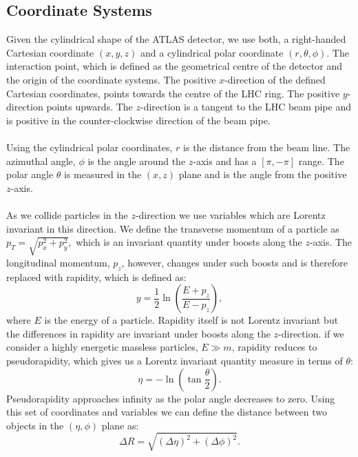 \subsection{Coordinate Systems}
Given the cylindrical shape of the ATLAS detector, we use both, a right-handed Cartesian coordinate $(x,y,z)$ and  a cylindrical polar coordinate $(r,\theta,\phi)$. The interaction point, which is defined as the geometrical centre of the detector and the origin of the coordinate systems. The positive $x$-direction of the defined Cartesian coordinates, points towards the centre of the LHC ring. The positive $y$-direction points upwards. The $z$-direction is a tangent to the LHC beam pipe and is positive in the counter-clockwise direction of the beam pipe.
\\
\\
Using the cylindrical polar coordinates, $r$ is the distance from the beam line. The azimuthal angle, $\phi$ is the angle around the $z$-axis and has a $[\pi,-\pi]$ range. The polar angle $\theta$ is measured in the $(x,z)$ plane and is the angle from the positive $z$-axis.
\\
\\
As we collide particles in the $z$-direction we use variables which are Lorentz invariant in this direction. We define the transverse momentum of a particle as $p_T = \sqrt{p_x^2 + p_y^2},$ which is an invariant quantity under boosts along the $z$-axis. The longitudinal momentum, $p_z$, however, changes under such boosts and is therefore replaced with rapidity, which is defined as:  
\begin{equation}
    y=\frac{1}{2}\ln\left(\frac{E+p_z}{E-p_z} \right),
\end{equation}
where $E$ is the energy of a particle. Rapidity itself is not Lorentz invariant but the differences in rapidity are invariant under boosts along the $z$-direction. if we consider a highly energetic massless particles, $E\gg m$, rapidity reduces to pseudorapidity, which gives us a Lorentz invariant quantity measure in terms of $\theta$:
\begin{equation}
    \eta =-\ln\left( \tan\frac{\theta}{2}\right).
\end{equation}
Pseudorapidity approaches infinity as the polar angle decreases to zero. Using this set of coordinates and variables we can define the distance between two objects in the $(\eta, \phi)$ plane as:
\begin{equation}
    \Delta R = \sqrt{(\Delta \eta)^2 + (\Delta\phi)^2}.
\end{equation}
